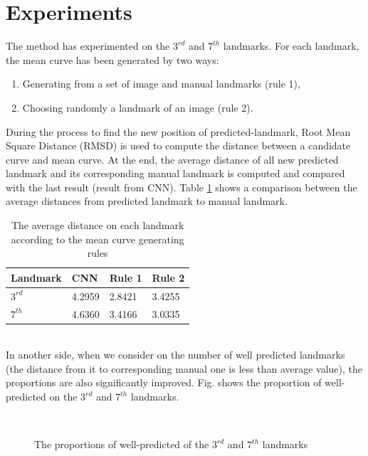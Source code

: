 \documentclass[12pt,a4paper]{article}
\begin{document}
\section{Experiments}
The method has experimented on the $3^{rd}$ and $7^{th}$ landmarks. For each landmark, the mean curve has been generated by two ways:
\begin{enumerate}
	\item Generating from a set of image and manual landmarks (rule 1),
	\item Choosing randomly a landmark of an image (rule 2).
\end{enumerate}
During the process to find the new position of predicted-landmark, Root Mean Square Distance (RMSD) is used to compute the distance between a candidate curve and mean curve. At the end, the average distance of all new predicted landmark and its corresponding manual landmark is computed and compared with the last result (result from CNN). Table \ref{avgdistance2} shows a comparison between the average distances from predicted landmark to manual landmark.
\begin{table}[h!]
	\centering
	\begin{tabular}{l l l l }
	 Landmark & CNN & Rule 1 & Rule 2 \\ \hline
 	 $3^{rd}$ & 4.2959 & 2.8421 & 3.4255 \\ \hline
 	 $7^{th}$ & 4.6360 &	3.4166 & 3.0335 \\ \hline
	\end{tabular}
	\caption{The average distance on each landmark according to the mean curve generating rules}
	\label{avgdistance2}
\end{table}~\\
In another side, when we consider on the number of well predicted landmarks (the distance from it to corresponding manual one is less than average value), the proportions are also significantly improved. Fig. shows the proportion of well-predicted on the $3^{rd}$ and $7^{th}$ landmarks.
\begin{figure}[h!]
\centering
{}~~
\caption{The proportions of well-predicted of the $3^{rd}$ and $7^{th}$ landmarks}
\label{meancuvre}
\end{figure}~\\
\end{document}
